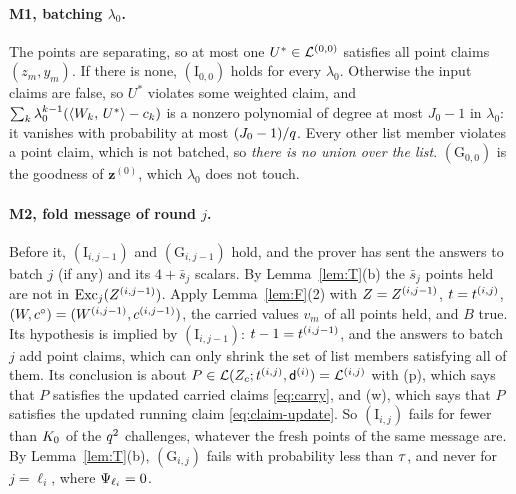 \paragraph{M1, batching $\lambda_0$.} The points are separating, so at most one $U^\ast\in\mathcal{L}^{(0,0)}$ satisfies all point claims $(z_m,y_m)$. If there is none, $(\mathrm I_{0,0})$ holds for every $\lambda_0$. Otherwise the input claims are false, so $U^\ast$ violates some weighted claim, and $\sum_k\lambda_0^{k-1}(\langle W_k,\, U^\ast \rangle-c_k)$ is a nonzero polynomial of degree at most $J_0-1$ in $\lambda_0$: it vanishes with probability at most $(J_0-1)/q$. Every other list member violates a point claim, which is not batched, so \emph{there is no union over the list}. $(\mathrm G_{0,0})$ is the goodness of $\mathbf z^{(0)}$, which $\lambda_0$ does not touch.

\paragraph{M2, fold message of round $j$.} Before it, $(\mathrm I_{i,j-1})$ and $(\mathrm G_{i,j-1})$ hold, and the prover has sent the answers to batch $j$ (if any) and its $4+\bar s_j$ scalars. By Lemma~\ref{lem:T}(b) the $\bar s_j$ points held are not in $\operatorname{Exc}_j(Z^{(i,j-1)})$. Apply Lemma~\ref{lem:F}(2) with $Z=Z^{(i,j-1)}$, $t=t^{(i,j)}$, $(W,c^\circ)=(W^{(i,j-1)},c^{(i,j-1)})$, the carried values $v_m$ of all points held, and $B$ true. Its hypothesis is implied by $(\mathrm I_{i,j-1})$: $t-1=t^{(i,j-1)}$, and the answers to batch $j$ add point claims, which can only shrink the set of list members satisfying all of them. Its conclusion is about $P\in\mathcal{L}(Z_c;t^{(i,j)},\mathsf{d}^{(i)})=\mathcal{L}^{(i,j)}$ with (p), which says that $P$ satisfies the updated carried claims \eqref{eq:carry}, and (w), which says that $P$ satisfies the updated running claim \eqref{eq:claim-update}. So $(\mathrm I_{i,j})$ fails for fewer than $K_0$ of the $q^2$ challenges, whatever the fresh points of the same message are. By Lemma~\ref{lem:T}(b), $(\mathrm G_{i,j})$ fails with probability less than $\tau$, and never for $j=\ell_i$, where $\Psi_{\ell_i}=0$.

